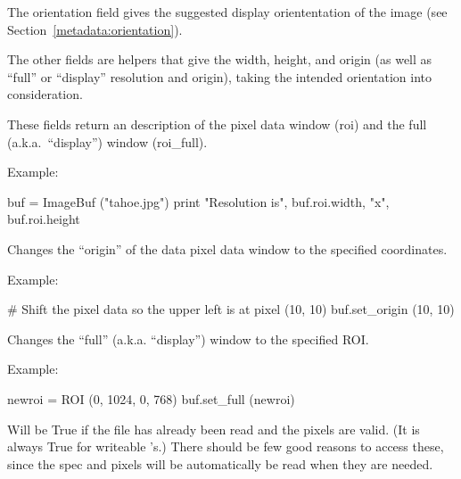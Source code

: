 The {\cf orientation} field gives the suggested display oriententation of
the image (see Section~\ref{metadata:orientation}).

The other fields are helpers that give the width, height, and origin
(as well as ``full'' or ``display'' resolution and origin), taking the
intended orientation into consideration.
\apiend

These fields return an \ROI description of the pixel data window
({\cf roi}) and the full (a.k.a.\ ``display'') window ({\cf roi_full}).

\noindent Example:
\begin{code}
    buf = ImageBuf ("tahoe.jpg")
    print "Resolution is", buf.roi.width, "x", buf.roi.height
\end{code}
\apiend

\NEW %
Changes the ``origin'' of the data pixel data window to the specified
coordinates.

\noindent Example:
\begin{code}
    # Shift the pixel data so the upper left is at pixel (10, 10)
    buf.set_origin (10, 10)
\end{code}
\apiend

Changes the ``full'' (a.k.a. ``display'') window to the specified ROI.

\noindent Example:
\begin{code}
    newroi = ROI (0, 1024, 0, 768)
    buf.set_full (newroi)
\end{code}
\apiend

Will be {\cf True} if the file has already been read and the pixels are
valid. (It is always {\cf True} for writeable \ImageBuf's.)
There should be few good reasons to access these, since the spec and pixels
will be automatically be read when they are needed. 
\apiend

